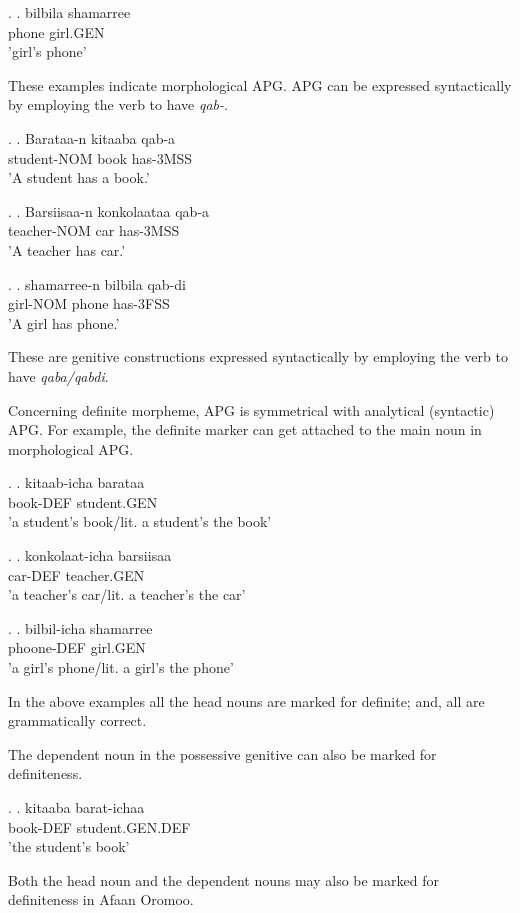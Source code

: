 \documentclass[11pt,a4paper]{article}
\begin{document}
	\ex.
	\ag.
	bilbila shamarree\\
	phone girl.GEN\\
	'girl's phone'
	
	
	These examples indicate morphological APG. APG can be expressed syntactically by employing the verb to have \emph{qab-}. 
	
		
	\ex.
	\ag.
	Barataa-n kitaaba qab-a\\
	student-NOM book has-3MSS\\
	'A student has a book.'
	
	\ex.
	\ag.
	Barsiisaa-n konkolaataa qab-a\\
	teacher-NOM car has-3MSS\\
	'A teacher has car.'
	
	\ex.
	\ag.
	shamarree-n bilbila qab-di\\
	girl-NOM phone has-3FSS\\
	'A girl has phone.'
	
	These are genitive constructions expressed syntactically by employing the verb to have \emph{qaba/qabdi}.
	
	Concerning definite morpheme,  APG is symmetrical with analytical (syntactic) APG. For example, the definite marker can get attached to the main noun in morphological APG. 
	
	\ex.
	\ag.
	kitaab-icha barataa\\
	book-DEF student.GEN\\
	'a student's book/lit. a student's the book'
	
	\ex.
	\ag.
	konkolaat-icha barsiisaa\\
	car-DEF teacher.GEN\\
	'a teacher's car/lit. a teacher's the car'
	
	\ex.
	\ag.
	bilbil-icha shamarree\\
	phoone-DEF girl.GEN\\
	'a girl's phone/lit. a girl's the phone'
	
	In the above examples all the head nouns are marked for definite; and, all are grammatically correct. 
	
	The dependent noun in the possessive genitive can also be marked for definiteness. 
	
	\ex.
	\ag.
	kitaaba barat-ichaa\\
	book-DEF student.GEN.DEF\\
	'the student's book'
	
	Both the head noun and the dependent nouns may also be marked for definiteness in Afaan Oromoo.
	
\end{document}
